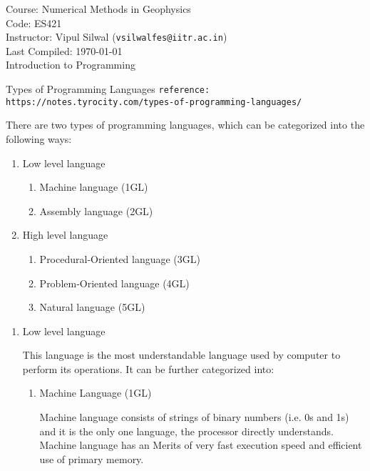 \documentclass[11pt,titlepage,fleqn]{article}
\begin{document}
\noindent Course: Numerical Methods in Geophysics\\
\noindent Code: ES421\\
\noindent Instructor: Vipul Silwal (\verb+vsilwalfes@iitr.ac.in+) \\ 
\noindent Last Compiled: \today \\

{\huge Introduction to Programming}

 \tableofcontents 
\begin{section}{Types of Programming Languages}
\verb+reference: https://notes.tyrocity.com/types-of-programming-languages/+


There are two types of programming languages, which can be categorized into the following ways:
\begin{enumerate}
\item  Low level language
\begin{enumerate}
\item  Machine language (1GL)
\item  Assembly language (2GL)
\end{enumerate}
\item  High level language
\begin{enumerate}
\item  Procedural-Oriented language (3GL)
\item  Problem-Oriented language (4GL)
\item  Natural language (5GL)
\end{enumerate}
\end{enumerate}

\iffalse
\begin{enumerate}
 \item       Low level language

This language is the most understandable language used by computer to perform its operations. It can be further categorized into:
\begin{enumerate}
\item  Machine Language (1GL)

Machine language consists of strings of binary numbers (i.e. 0s and 1s) and it is the only one language, the processor directly understands. Machine language has an Merits of very fast execution speed and efficient use of primary memory.


\end{enumerate}
\end{enumerate}
\end{section}
\end{document}
